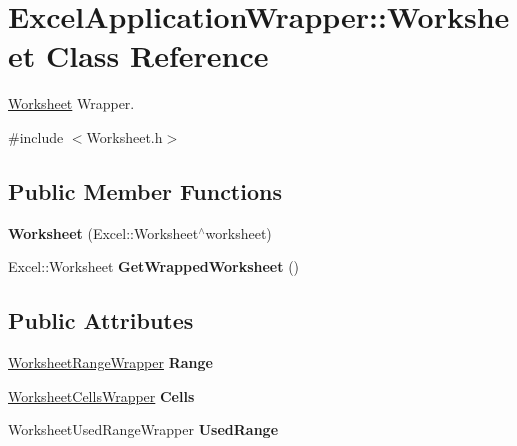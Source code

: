 \hypertarget{class_excel_application_wrapper_1_1_worksheet}{}\section{Excel\+Application\+Wrapper\+:\+:Worksheet Class Reference}
\label{class_excel_application_wrapper_1_1_worksheet}


\hyperlink{class_excel_application_wrapper_1_1_worksheet}{Worksheet} Wrapper.  




{\ttfamily \#include $<$Worksheet.\+h$>$}

\subsection*{Public Member Functions}
\begin{DoxyCompactItemize}
\item 
\hypertarget{class_excel_application_wrapper_1_1_worksheet_a8f7d02d051a99285fa40b19018c2d803}{}{\bfseries Worksheet} (Excel\+::\+Worksheet$^\wedge$worksheet)\label{class_excel_application_wrapper_1_1_worksheet_a8f7d02d051a99285fa40b19018c2d803}

\item 
\hypertarget{class_excel_application_wrapper_1_1_worksheet_a5cbfc6765710a9bdc1a4730a4cf5ba1d}{}Excel\+::\+Worksheet {\bfseries Get\+Wrapped\+Worksheet} ()\label{class_excel_application_wrapper_1_1_worksheet_a5cbfc6765710a9bdc1a4730a4cf5ba1d}

\end{DoxyCompactItemize}
\subsection*{Public Attributes}
\begin{DoxyCompactItemize}
\item 
\hypertarget{class_excel_application_wrapper_1_1_worksheet_a8d9d1ac7df2930d190baaa52e44767bc}{}\hyperlink{class_excel_application_wrapper_1_1_worksheet_range_wrapper}{Worksheet\+Range\+Wrapper} {\bfseries Range}\label{class_excel_application_wrapper_1_1_worksheet_a8d9d1ac7df2930d190baaa52e44767bc}

\item 
\hypertarget{class_excel_application_wrapper_1_1_worksheet_a186ce7cc33c79fb9bf36540a4757ddec}{}\hyperlink{class_excel_application_wrapper_1_1_worksheet_cells_wrapper}{Worksheet\+Cells\+Wrapper} {\bfseries Cells}\label{class_excel_application_wrapper_1_1_worksheet_a186ce7cc33c79fb9bf36540a4757ddec}

\item 
\hypertarget{class_excel_application_wrapper_1_1_worksheet_ae4421358a32391f8d6812fb2c75fdb76}{}Worksheet\+Used\+Range\+Wrapper {\bfseries Used\+Range}\label{class_excel_application_wrapper_1_1_worksheet_ae4421358a32391f8d6812fb2c75fdb76}

\end{DoxyCompactItemize}


